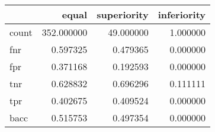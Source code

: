 \begin{tabular}{lrrr}
\toprule
{} &       equal &  superiority &  inferiority \\
\midrule
count &  352.000000 &    49.000000 &     1.000000 \\
fnr   &    0.597325 &     0.479365 &     0.000000 \\
fpr   &    0.371168 &     0.192593 &     0.000000 \\
tnr   &    0.628832 &     0.696296 &     0.111111 \\
tpr   &    0.402675 &     0.409524 &     0.000000 \\
bacc  &    0.515753 &     0.497354 &     0.000000 \\
\bottomrule
\end{tabular}
